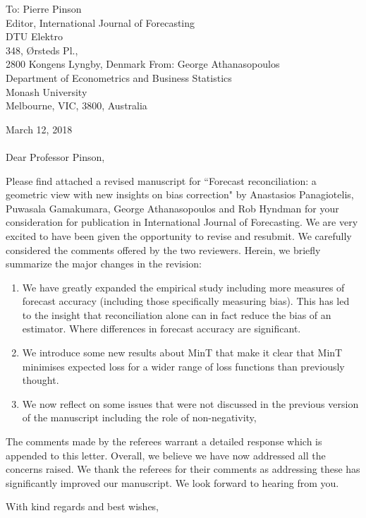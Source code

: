 \documentclass[11pt,a4paper]{letter}
\date{}
\begin{document}
 \begin{letter}{To: Pierre Pinson\\
 	Editor, International Journal of Forecasting\\
 	DTU Elektro\\
 	348, {\O}rsteds Pl., \\
 	2800 Kongens Lyngby, Denmark}
    From: George Athanasopoulos\\
    Department of Econometrics and Business Statistics\\
    Monash University\\
    Melbourne, VIC, 3800, Australia
 
 \opening{ March 12, 2018\\ \\Dear Professor Pinson,}
 \medskip

Please find attached a revised manuscript for ``Forecast reconciliation: a geometric view with new insights on bias correction" by Anastasios Panagiotelis, Puwasala Gamakumara, George Athanasopoulos and Rob Hyndman for your consideration for publication in International Journal of Forecasting. We are very excited to have been given the opportunity to revise and resubmit. We carefully considered the comments offered by the two reviewers. Herein, we briefly summarize the major changes in the revision:
\begin{enumerate}
	\item We have greatly expanded the empirical study including more measures of forecast accuracy (including those specifically measuring bias).  This has led to the insight that reconciliation alone can in fact reduce the bias of an estimator.  Where differences in forecast accuracy are significant.
	\item We introduce some new results about MinT that make it clear that MinT minimises expected loss for a wider range of loss functions than previously thought.
	\item We now reflect on some issues that were not discussed in the previous version of the manuscript including the role of non-negativity, 
\end{enumerate}

The comments made by the referees warrant a detailed response which is appended to this letter. Overall, we believe we have now addressed all the concerns raised. We thank the referees for their comments as addressing these has significantly improved our manuscript. We look forward to hearing from you.

 \closing{With kind regards and best wishes,}

 \end{letter}
\end{document}
